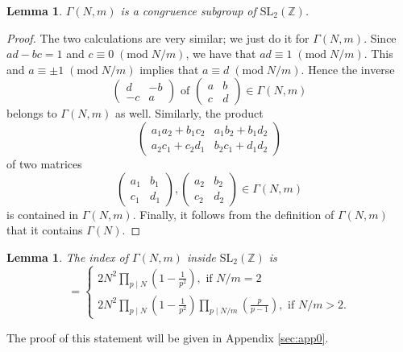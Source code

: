 \documentclass[11pt,a4paper]{amsart}
\newtheorem{lemma}[theorem]{Lemma}
\theoremstyle{definition}
\newcommand{\SZ}{\mathbb{Z}}                    %
\begin{document}
\begin{lemma} $\Gamma(N,m)$ is a congruence subgroup of $\mathrm{SL_2}(\SZ)$.
\end{lemma}
\begin{proof} The two calculations are very similar; we just do it for $\Gamma(N,m)$.
Since $ad-bc=1$ and $c\equiv 0  \;(\mathrm{mod}\;N/m)$, we have that $ad\equiv 1  \;(\mathrm{mod}\;N/m)$. This and $a \equiv \pm 1 \;(\mathrm{mod}\;N/m)$ implies that $a\equiv d  \;(\mathrm{mod}\;N/m)$. Hence the inverse
\[\begin{pmatrix} d & -b \\ -c & a \end{pmatrix} \textrm{ of } \begin{pmatrix} a & b \\ c & d \end{pmatrix} \in \Gamma(N,m)\]
belongs to $\Gamma(N,m)$ as well. Similarly, the product
\[ 
\begin{pmatrix} a_1a_2+b_1c_2 & a_1b_2+b_1d_2 \\ a_2c_1+c_2d_1 & b_2c_1+d_1d_2 \end{pmatrix}
\]
\textrm{ of two matrices }
\[\begin{pmatrix} a_1 & b_1 \\ c_1 & d_1 \end{pmatrix}, \begin{pmatrix} a_2 & b_2 \\ c_2 & d_2 \end{pmatrix} \in \Gamma(N,m) \]
is contained in $\Gamma(N,m)$. Finally, it follows from the definition of $\Gamma(N,m)$ that it contains $\Gamma(N)$.
\end{proof}
\begin{lemma}
\label{lem:indgNmsl2}
The index of $\Gamma(N,m)$ inside $\mathrm{SL}_2(\SZ)$ is
\begin{equation*} [\mathrm{SL}_2(\SZ) \, : \, \Gamma(N,m) ] = \begin{cases} 
2N^2\prod_{p \mid N}\left(1-\frac{1}{p^2} \right),\textrm{ if } N/m =2 \\
2N^2\prod_{p \mid N}\left(1-\frac{1}{p^2} \right) \prod_{p \mid N/m }\left(\frac{p}{p-1} \right),\textrm{ if } N/m >2.
\end{cases}
\end{equation*}
\end{lemma}
The proof of this statement will be given in Appendix \ref{sec:app0}.
\end{document}
